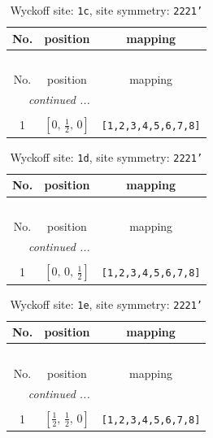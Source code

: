 \documentclass[fleqn,8pt]{jsarticle}
\begin{document}
\begin{longtable}{ccc}
\caption{Wyckoff site: {\tt 1c}, site symmetry: {\tt 2221'}}
 \\
 \hline \hline
No. & position & mapping \\ \hline \endfirsthead

\multicolumn{2}{l}{\tablename\ \thetable{}} \\
 \hline \hline
No. & position & mapping \\ \hline \endhead

 \hline \hline
\multicolumn{2}{r}{\footnotesize\it continued ...} \\ \endfoot

 \hline \hline
\multicolumn{2}{r}{} \\ \endlastfoot

1 & $\left[ 0,\, \frac{1}{2},\, 0 \right]$ & {\tt [1,2,3,4,5,6,7,8]} \\
\end{longtable}
\renewcommand{\arraystretch}{1.2}
\begin{longtable}{ccc}
\caption{Wyckoff site: {\tt 1d}, site symmetry: {\tt 2221'}}
 \\
 \hline \hline
No. & position & mapping \\ \hline \endfirsthead

\multicolumn{2}{l}{\tablename\ \thetable{}} \\
 \hline \hline
No. & position & mapping \\ \hline \endhead

 \hline \hline
\multicolumn{2}{r}{\footnotesize\it continued ...} \\ \endfoot

 \hline \hline
\multicolumn{2}{r}{} \\ \endlastfoot

1 & $\left[ 0,\, 0,\, \frac{1}{2} \right]$ & {\tt [1,2,3,4,5,6,7,8]} \\
\end{longtable}
\renewcommand{\arraystretch}{1.2}
\begin{longtable}{ccc}
\caption{Wyckoff site: {\tt 1e}, site symmetry: {\tt 2221'}}
 \\
 \hline \hline
No. & position & mapping \\ \hline \endfirsthead

\multicolumn{2}{l}{\tablename\ \thetable{}} \\
 \hline \hline
No. & position & mapping \\ \hline \endhead

 \hline \hline
\multicolumn{2}{r}{\footnotesize\it continued ...} \\ \endfoot

 \hline \hline
\multicolumn{2}{r}{} \\ \endlastfoot

1 & $\left[ \frac{1}{2},\, \frac{1}{2},\, 0 \right]$ & {\tt [1,2,3,4,5,6,7,8]} \\
\end{longtable}
\end{document}
